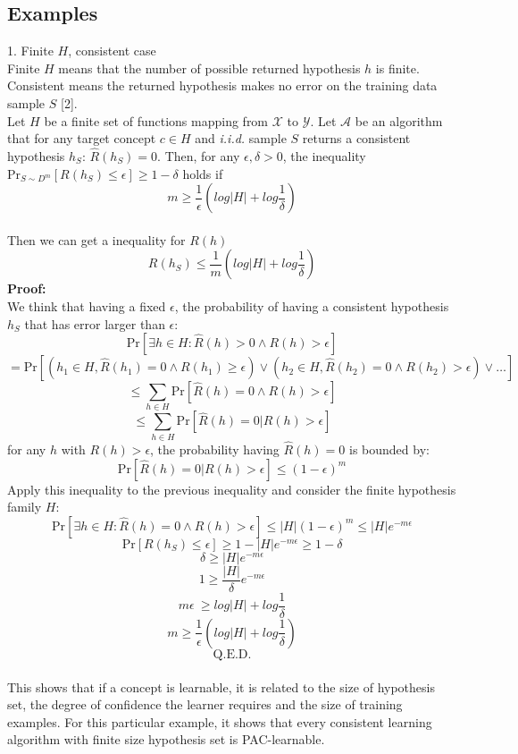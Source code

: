 \documentclass[12pt]{article}
\theoremstyle{definition}
\theoremstyle{remark}
\numberwithin{equation}{section}
\begin{document}
\subsection{Examples}
1. Finite $H$, consistent case \\[0.2cm]
Finite $H$ means that the number of possible returned hypothesis $h$ is finite. Consistent means the returned hypothesis makes no error on the training data sample $S$ [2].\\[0.2cm]
Let $H$ be a finite set of functions mapping from $\mathcal{X}$ to $\mathcal{Y}$. Let $\mathcal{A}$ be an algorithm that for any target concept $c \in H$ and \emph{i.i.d.} sample $S$ returns a consistent hypothesis $h_{S}$: $\widehat{R}(h_S) = 0$. Then, for any $\epsilon, \delta > 0$, the inequality $\text{Pr}_{S \sim D^m}[R(h_S) \leq \epsilon] \geq 1-\delta$ holds if
\[m \geq \frac{1}{\epsilon}(log|H|+log\frac{1}{\delta})\] \\[0.2cm]
Then we can get a inequality for $R(h)$
\[R(h_S) \leq \frac{1}{m}(log|H| + log\frac{1}{\delta})\]
\textbf{Proof:}\\[0.2cm]
We think that having a fixed $\epsilon$, the probability of having a consistent hypothesis $h_S$ that has error larger than $\epsilon$:
\[\text{Pr}[\exists h \in H: \widehat{R}(h) > 0  \wedge R(h) > \epsilon]\]
\[= \text{Pr}[(h_1 \in H, \widehat{R}(h_1)=0 \wedge R(h_1) \geq \epsilon) \vee (h_2 \in H, \widehat{R}(h_2) = 0 \wedge R(h_2) > \epsilon) \vee \dots]\]
\[\leq \sum_{h\in H}\text{Pr}[\widehat{R}(h) = 0 \wedge R(h)> \epsilon]\]
\[\leq \sum_{h\in H}\text{Pr}[\widehat{R}(h) = 0 | R(h)> \epsilon]\]
for any $h$ with $R(h) > \epsilon$, the probability having $\widehat{R}(h) = 0$ is bounded by:
\[\text{Pr}[\widehat{R}(h)=0| R(h)>\epsilon] \leq (1-\epsilon)^m\]
Apply this inequality to the previous inequality and consider the finite hypothesis family $H$:
\[\text{Pr}[\exists h \in H: \widehat{R}(h) = 0 \wedge R(h) > \epsilon] \leq |H|(1-\epsilon)^m \leq |H|e^{-m\epsilon}\]
\[\text{Pr}[R(h_S) \leq \epsilon] \geq 1 - |H|e^{-m\epsilon} \geq 1 - \delta  \]
\[\delta \geq |H|e^{-m\epsilon}\]
\[1 \geq \frac{|H|}{\delta}e^{-m\epsilon}\]
\[m\epsilon\ \geq log|H| + log\frac{1}{\delta}\]
\[m \geq \frac{1}{\epsilon} ( log|H| + log\frac{1}{\delta})\]
\[\text{Q.E.D.}\]\\[0.2cm]
This shows that if a concept is learnable, it is related to the size of hypothesis set, the degree of confidence the learner requires and the size of training examples. For this particular example, it shows that every consistent learning algorithm with finite size hypothesis set is PAC-learnable.\\[0.2cm]
\end{document}

